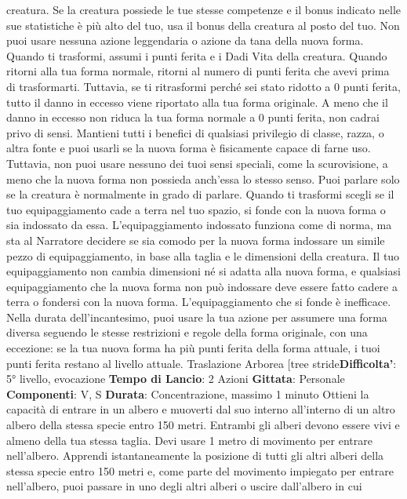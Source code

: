 \begin{multicols}{2}
creatura. Se la creatura possiede le tue stesse
competenze e il bonus indicato nelle sue statistiche è
più alto del tuo, usa il bonus della creatura al posto del
tuo. Non puoi usare nessuna azione leggendaria o
azione da tana della nuova forma.
Quando ti trasformi, assumi i punti ferita e i Dadi Vita
della creatura. Quando ritorni alla tua forma normale,
ritorni al numero di punti ferita che avevi prima di
trasformarti. Tuttavia, se ti ritrasformi perché sei stato
ridotto a 0 punti ferita, tutto il danno in eccesso viene
riportato alla tua forma originale. A meno che il danno in
eccesso non riduca la tua forma normale a 0 punti
ferita, non cadrai privo di sensi.
Mantieni tutti i benefici di qualsiasi privilegio di classe,
razza, o altra fonte e puoi usarli se la nuova forma è
fisicamente capace di farne uso. Tuttavia, non puoi
usare nessuno dei tuoi sensi speciali, come la
scurovisione, a meno che la nuova forma non possieda
anch’essa lo stesso senso. Puoi parlare solo se la
creatura è normalmente in grado di parlare.
Quando ti trasformi scegli se il tuo equipaggiamento
cade a terra nel tuo spazio, si fonde con la nuova forma
o sia indossato da essa. L’equipaggiamento indossato
funziona come di norma, ma sta al Narratore decidere se sia
comodo per la nuova forma indossare un simile pezzo
di equipaggiamento, in base alla taglia e le dimensioni
della creatura. Il tuo equipaggiamento non cambia
dimensioni né si adatta alla nuova forma, e qualsiasi
equipaggiamento che la nuova forma non può
indossare deve essere fatto cadere a terra o fondersi
con la nuova forma. L’equipaggiamento che si fonde è
inefficace.
Nella durata dell’incantesimo, puoi usare la tua azione
per assumere una forma diversa seguendo le stesse
restrizioni e regole della forma originale, con una
eccezione: se la tua nuova forma ha più punti ferita
della forma attuale, i tuoi punti ferita restano al livello
attuale.
Traslazione Arborea
[tree stride\textbf{Difficolta'}:
5° livello, evocazione
\textbf{Tempo di Lancio}: 2 Azioni
\textbf{Gittata}: Personale
\textbf{Componenti}: V, S
\textbf{Durata}: Concentrazione, massimo 1 minuto
Ottieni la capacità di entrare in un albero e muoverti dal
suo interno all’interno di un altro albero della stessa
specie entro 150 metri. Entrambi gli alberi devono
essere vivi e almeno della tua stessa taglia. Devi usare
1 metro di movimento per entrare nell’albero. Apprendi
istantaneamente la posizione di tutti gli altri alberi della
stessa specie entro 150 metri e, come parte del
movimento impiegato per entrare nell’albero, puoi
passare in uno degli altri alberi o uscire dall’albero in cui

\end{multicols}
